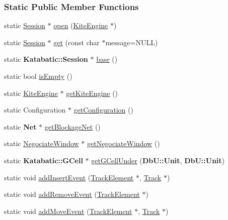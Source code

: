 \subsubsection*{Static Public Member Functions}
\begin{DoxyCompactItemize}
\item 
static \hyperlink{classKite_1_1Session}{Session} $\ast$ \hyperlink{classKite_1_1Session_ab8362982a442b5a67f5bd76d6b6caf93}{open} (\hyperlink{classKite_1_1KiteEngine}{Kite\-Engine} $\ast$)
\item 
static \hyperlink{classKite_1_1Session}{Session} $\ast$ \hyperlink{classKite_1_1Session_a76f17c3642eaeba85fa0af5ae9d208b4}{get} (const char $\ast$message=N\-U\-L\-L)
\item 
static {\bf Katabatic\-::\-Session} $\ast$ \hyperlink{classKite_1_1Session_a8a3fc782c34dc075bb2e14209e245494}{base} ()
\item 
static bool \hyperlink{classKite_1_1Session_af337ffd75e4f019ce15302c60715d84b}{is\-Empty} ()
\item 
static \hyperlink{classKite_1_1KiteEngine}{Kite\-Engine} $\ast$ \hyperlink{classKite_1_1Session_a7b6c91acd2c2a7c082b3b006c1bdc91d}{get\-Kite\-Engine} ()
\item 
static Configuration $\ast$ \hyperlink{classKite_1_1Session_a9a7fbadfe526875680f698c76adfb128}{get\-Configuration} ()
\item 
static {\bf Net} $\ast$ \hyperlink{classKite_1_1Session_aef6f41b0e8265ad574d1797f46ab9fa8}{get\-Blockage\-Net} ()
\item 
static \hyperlink{classKite_1_1NegociateWindow}{Negociate\-Window} $\ast$ \hyperlink{classKite_1_1Session_a39ebff178f2e0abb9d5a29f485e0bbab}{get\-Negociate\-Window} ()
\item 
static {\bf Katabatic\-::\-G\-Cell} $\ast$ \hyperlink{classKite_1_1Session_a27ecb1cf5ffabe1c7901c5c894a5067d}{get\-G\-Cell\-Under} ({\bf Db\-U\-::\-Unit}, {\bf Db\-U\-::\-Unit})
\item 
static void \hyperlink{classKite_1_1Session_ad4f08dfb62ce626ed72023ce02e7205f}{add\-Insert\-Event} (\hyperlink{classKite_1_1TrackElement}{Track\-Element} $\ast$, \hyperlink{classKite_1_1Track}{Track} $\ast$)
\item 
static void \hyperlink{classKite_1_1Session_aedd573fc951ed93f8ada5b0522813c3a}{add\-Remove\-Event} (\hyperlink{classKite_1_1TrackElement}{Track\-Element} $\ast$)
\item 
static void \hyperlink{classKite_1_1Session_aa42e4cb9e2559c00d68821f535ef7838}{add\-Move\-Event} (\hyperlink{classKite_1_1TrackElement}{Track\-Element} $\ast$, \hyperlink{classKite_1_1Track}{Track} $\ast$)

\end{DoxyCompactItemize}
